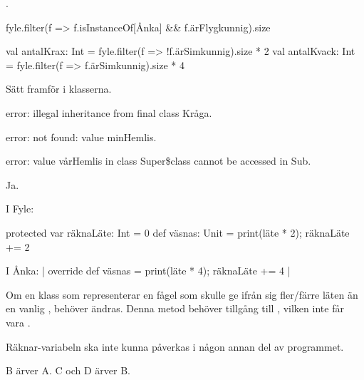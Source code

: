 \Subtask {}.
         
\Task

\Subtask 
\begin{Code}
fyle.filter(f => f.isInstanceOf[Ånka] && f.ärFlygkunnig).size 
\end{Code}
      
\Subtask 
\begin{Code}
val antalKrax: Int = fyle.filter(f => !f.ärSimkunnig).size * 2
val antalKvack: Int = fyle.filter(f => f.ärSimkunnig).size * 4 
\end{Code}
      
\Task

\Subtask Sätt  framför  i klasserna.

\Subtask error: illegal inheritance from final class Kråga.

\Task

\Subtask error: not found: value minHemlis.

\Subtask error: value vårHemlis in class Super\$class cannot be accessed in Sub.

\Subtask Ja.

\Task

\Subtask I Fyle: 
\begin{Code}
protected var räknaLäte: Int = 0
def väsnas: Unit = { print(läte * 2); räknaLäte += 2 }
\end{Code}

I Ånka: \code| override def väsnas = { print(läte * 4); räknaLäte += 4 }|
      
\Subtask {}

\Subtask Om en klass som representerar en fågel som skulle ge ifrån sig fler/färre läten än en vanlig , behöver  ändras. Denna metod behöver tillgång till , vilken inte får vara .

\Subtask Räknar-variabeln ska inte kunna påverkas i någon annan del av programmet.

\Task 

\Subtask B ärver A. C och D ärver B.

